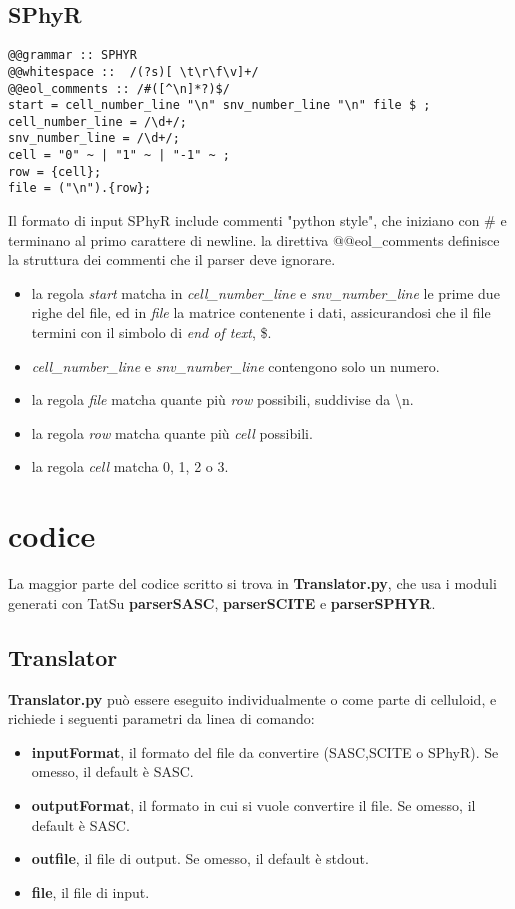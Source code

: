 \subsection{SPhyR}
{\selectfont
\begin{verbatim}
@@grammar :: SPHYR
@@whitespace ::  /(?s)[ \t\r\f\v]+/
@@eol_comments :: /#([^\n]*?)$/
start = cell_number_line "\n" snv_number_line "\n" file $ ;
cell_number_line = /\d+/;
snv_number_line = /\d+/;
cell = "0" ~ | "1" ~ | "-1" ~ ;
row = {cell};
file = ("\n").{row};
\end{verbatim}
}
Il formato di input SPhyR include commenti "python style", che iniziano con \# e terminano al primo carattere di newline. la direttiva @@eol\_comments definisce la struttura dei commenti che il parser deve ignorare.
\begin{itemize}
\item la regola \textit{start} matcha in \textit{cell\_number\_line} e \textit{snv\_number\_line} le prime due righe del file, ed in \textit{file} la matrice contenente i dati, assicurandosi che il file termini con il simbolo di \textit{end of text}, \$.
\item \textit{cell\_number\_line} e \textit{snv\_number\_line} contengono solo un numero.
\item la regola \textit{file} matcha quante più \textit{row} possibili, suddivise da \textbackslash n.
\item la regola \textit{row} matcha quante più \textit{cell} possibili.
\item la regola \textit{cell} matcha 0, 1, 2 o 3.
\end{itemize}

\section{codice}
La maggior parte del codice scritto si trova in \textbf{Translator.py}, che usa i moduli generati con TatSu \textbf{parserSASC}, \textbf{parserSCITE} e \textbf{parserSPHYR}.

\subsection{Translator}
\textbf{Translator.py} può essere eseguito individualmente o come parte di celluloid, e richiede i seguenti parametri da linea di comando:
\begin{itemize}
\item \textbf{inputFormat}, il formato del file da convertire (SASC,SCITE o SPhyR). Se omesso, il default è SASC.
\item \textbf{outputFormat}, il formato in cui si vuole convertire il file. Se omesso, il default è SASC.
\item \textbf{outfile}, il file di output. Se omesso, il default è stdout.
\item \textbf{file}, il file di input. 
\end{itemize}
